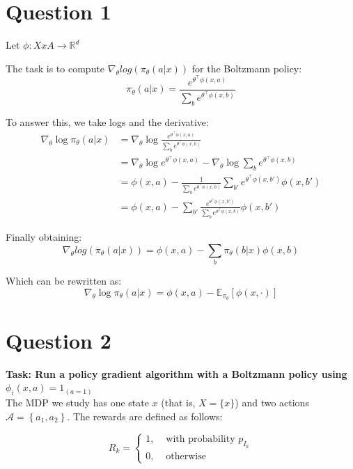 \documentclass[a4paper, 11pt]{article} %
\begin{document}
\section*{Question 1}

Let $\phi : X x A \rightarrow \mathbb{R}^{d}$

The task is to compute $\nabla_{\theta}log(\pi_{\theta}(a|x))$ for the Boltzmann policy:
\begin{equation}
\pi_{\theta}(a | x)= \frac{e^{\theta^{\top} \phi(x, a)}}{\sum_{b} e^{\theta^{\top} \phi(x, b)}}
\end{equation}

To answer this, we take logs and the derivative:
\begin{align}
\nabla_{\theta} \log \pi_{\theta}(a | x) 
&=\nabla_{\theta} \log \frac{e^{\theta^{\top} \phi(x, a)}}{\sum_{b} e^{\theta^{\top} \phi(x, b)}}  \\
&=\nabla_{\theta} \log e^{\theta^{\top} \phi(x, a)}-\nabla_{\theta} \log \sum_{b} e^{\theta^{\top} \phi(x, b)} \\
&=\phi(x, a)-\frac{1}{\sum_{b} e^{\theta^{\top} \phi(x, b)}}\sum_{b'} e^{\theta^{\top} \phi(x, b')} \phi(x, b') \\
& =\phi(x, a)-\sum_{b'} \frac{e^{\theta^{\top} \phi(x, b')} }{\sum_{b} e^{\theta^{\top} \phi (x, b)} } \phi(x, b')
\end{align}

Finally obtaining:
\begin{equation}
\nabla_{\theta}log(\pi_{\theta}(a|x)) = \phi(x, a)-\sum_{b} \pi_{\theta}(b|x) \phi(x, b)
\end{equation}

Which can be rewritten as:
\begin{equation}
\nabla_{\theta} \log \pi_{\theta}(a| x)=\phi(x, a)-\mathbb{E}_{\pi_{\theta}}[\phi(x, \cdot)]
\end{equation}


\section*{Question 2}
\textbf{Task: Run a policy gradient algorithm with a Boltzmann policy using $\phi_i(x,a) = 1_{(a=1)}$} \\

The MDP we study has one state $x$ (that is, $X=\{x\}$) and two actions $\mathcal{A}=\left\{a_{1}, a_{2}\right\}$. The rewards are defined as follows: 

$$
R_{k}=\left\{\begin{array}{ll}{1,} & {\text { with probability } p_{I_{k}}} \\ {0,} & {\text { otherwise }}\end{array}\right.
$$
\end{document}
